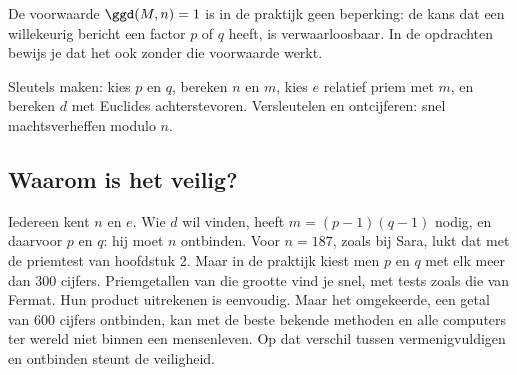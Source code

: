 De voorwaarde $\ggd(M, n) = 1$ is in de praktijk geen beperking: de kans dat een willekeurig bericht een factor $p$ of $q$ heeft, is verwaarloosbaar. In de opdrachten bewijs je dat het ook zonder die voorwaarde werkt.


\begin{werkwijze}
Sleutels maken: kies $p$ en $q$, bereken $n$ en $m$, kies $e$ relatief priem met $m$, en bereken $d$ met Euclides achterstevoren. Versleutelen en ontcijferen: snel machtsverheffen modulo $n$.
\end{werkwijze}

\begin{oefeningen}
\end{oefeningen}

\subsection{Waarom is het veilig?}

Iedereen kent $n$ en $e$. Wie $d$ wil vinden, heeft $m = (p - 1)(q - 1)$ nodig, en daarvoor $p$ en $q$: hij moet $n$ ontbinden. Voor $n = 187$, zoals bij Sara, lukt dat met de priemtest van hoofdstuk 2. Maar in de praktijk kiest men $p$ en $q$ met elk meer dan 300 cijfers. Priemgetallen van die grootte vind je snel, met tests zoals die van Fermat. Hun product uitrekenen is eenvoudig. Maar het omgekeerde, een getal van 600 cijfers ontbinden, kan met de beste bekende methoden en alle computers ter wereld niet binnen een mensenleven. Op dat verschil tussen vermenigvuldigen en ontbinden steunt de veiligheid.

